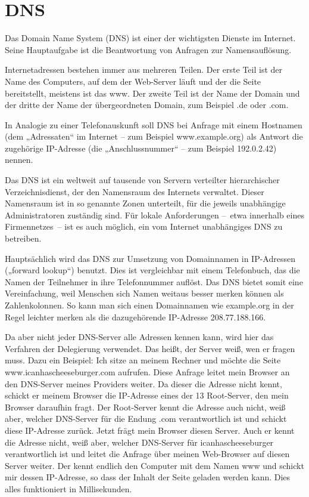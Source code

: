 \section{DNS}
Das Domain Name System (DNS) ist einer der wichtigsten Dienste im Internet. Seine Hauptaufgabe ist die Beantwortung von Anfragen zur Namensauflösung.

Internetadressen bestehen immer aus mehreren Teilen.
Der erste Teil ist der Name des Computers, auf dem der Web-Server läuft und der die Seite bereitstellt, meistens ist das www.
Der zweite Teil ist der Name der Domain und der dritte der Name der übergeordneten Domain, zum Beispiel .de oder .com.

In Analogie zu einer Telefonauskunft soll DNS bei Anfrage mit einem Hostnamen (dem „Adressaten“ im Internet – zum Beispiel www.example.org) als Antwort die zugehörige IP-Adresse (die „Anschlussnummer“ – zum Beispiel 192.0.2.42) nennen.

Das DNS ist ein weltweit auf tausende von Servern verteilter hierarchischer Verzeichnisdienst, der den Namensraum des Internets verwaltet. 
Dieser Namensraum ist in so genannte Zonen unterteilt, für die jeweils unabhängige Administratoren zuständig sind. Für lokale Anforderungen – etwa innerhalb eines Firmennetzes – ist es auch möglich, ein vom Internet unabhängiges DNS zu betreiben.

Hauptsächlich wird das DNS zur Umsetzung von Domainnamen in IP-Adressen („forward lookup“) benutzt. Dies ist vergleichbar mit einem Telefonbuch, das die Namen der Teilnehmer in ihre Telefonnummer auflöst. Das DNS bietet somit eine Vereinfachung, weil Menschen sich Namen weitaus besser merken können als Zahlenkolonnen. 
So kann man sich einen Domainnamen wie example.org in der Regel leichter merken als die dazugehörende IP-Adresse 208.77.188.166.

Da aber nicht jeder DNS-Server alle Adressen kennen kann, wird hier das Verfahren der Delegierung verwendet. Das heißt, der Server weiß, wen er fragen muss.
Dazu ein Beispiel:
Ich sitze an meinem Rechner und möchte die Seite www.icanhascheeseburger.com aufrufen. Diese Anfrage leitet mein Browser an den DNS-Server meines Providers weiter.
Da dieser die Adresse nicht kennt, schickt er meinem Browser die IP-Adresse eines der 13 Root-Server, den mein Browser daraufhin fragt. Der Root-Server kennt die Adresse auch nicht, weiß aber, welcher DNS-Server für die Endung .com verantwortlich ist und schickt diese IP-Adresse zurück.
Jetzt frägt mein Browser diesen Server. Auch er kennt die Adresse nicht, weiß aber, welcher DNS-Server für icanhascheeseburger verantwortlich ist und leitet die Anfrage über meinen Web-Browser auf diesen Server weiter.
Der kennt endlich den Computer mit dem Namen www und schickt mir dessen IP-Adresse, so dass der Inhalt der Seite geladen werden kann.
Dies alles funktioniert in Millisekunden.

